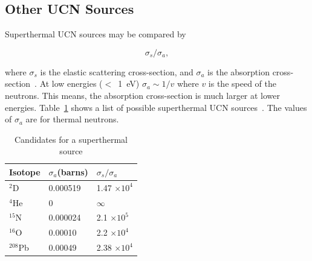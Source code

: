 \subsection{Other UCN Sources}
Superthermal UCN sources may be compared by

\begin{equation}
\sigma_s / \sigma_a,
\end{equation}

where $\sigma_s$ is the elastic scattering cross-section, and
$\sigma_a$ is the absorption
cross-section~\cite{Salvat2013,Atchison2009,Liu_thesis}. At low
energies ($<$~1~eV) $\sigma_a \sim 1/v$ where $v$ is the speed of the
neutrons. This means, the absorption cross-section is much larger at
lower energies.  Table~\ref{tab:other_sources} shows a list of
possible superthermal UCN sources~\cite{Liu_thesis}. The values of
$\sigma_a$ are for thermal neutrons.


\begin{table}
\begin{center}
\begin{tabular}{|l|l|l|}
\hline
Isotope & $\sigma_a$(barns) & $\sigma_s / \sigma_a$  \\
\hline
$^2$D & 0.000519 & 1.47 $\times 10^4$ \\
\hline
$^4$He & 0 & $\infty$ \\
\hline
$^{15}$N & 0.000024 & 2.1 $\times 10^5$ \\
\hline
$^{16}$O & 0.00010 & 2.2 $\times 10^4$ \\
\hline
$^{208}$Pb & 0.00049 &  2.38 $\times 10^4$\\
\hline
\end{tabular}
\end{center}
\caption{Candidates for a superthermal source\label{tab:other_sources}}
\end{table}

